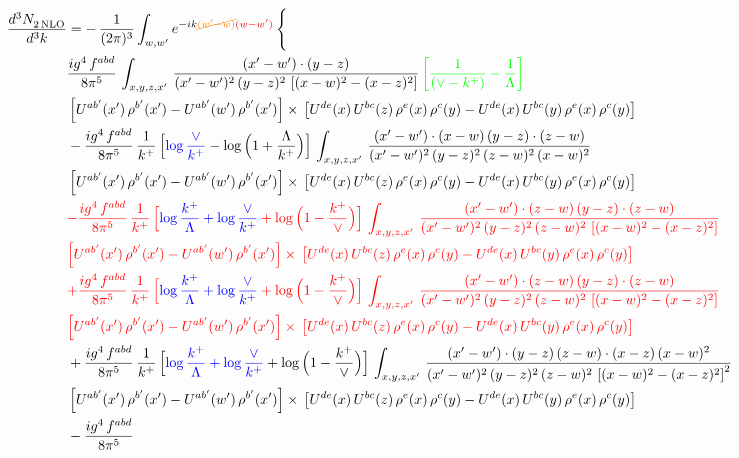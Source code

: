 \documentclass[9pt]{article}
\numberwithin{equation}{section}
\begin{document}
\begin{align}
   \frac{d^{3}N_{2\,\rm NLO}^{\rm}}{d^{3}k}  & = -\,\frac{1}{(2\pi)^{3}}  \int_{w, w^\prime} e^{-ik{\color{orange}\cancel{(w^\prime-w)}}{\color{red}(w-w^\prime)}}\, \Bigg\{\notag \\ & \frac{ig^{4}\, f^{abd}}{8\pi^{5}}\, \int_{x,y,z,x'}\,\frac{(x'-w')\cdot (y-z)}{(x'-w')^{2}\, (y-z)^{2}\,\left[(x-w)^{2}-(x-z)^{2}\right]}\,{\color{green}\left[\frac{1}{(\vee-k^{+})}-\frac{1}{\Lambda}\right]} \notag \\ & \left[U^{ab'}(x')\,\rho^{b'}(x')-U^{ab'}(w')\, \rho^{b'}(x')\right]\times\,\left[U^{de}(x)\,U^{bc}(z)\, \rho^{e}(x)\,\rho^{c}(y)-U^{de}(x)\,U^{bc}(y)\,\rho^{e}(x)\,\rho^{c}(y)\right]\notag \\ & -\frac{ig^{4}\, f^{abd}}{8\pi^{5}}\, \frac{1}{k^{+}}\, \Big[{\color{blue}\log\frac{\vee}{k^{+}}}-\log\Big(1+\frac{\Lambda}{k^{+}}\Big)\Big]\,\int_{x,y,z,x'}\,\frac{(x'-w')\cdot (x-w)\, (y-z)\cdot (z-w)}{(x'-w')^{2}\, (y-z)^{2}\, (z-w)^{2}\,(x-w)^{2}}\, \notag \\ & \left[U^{ab'}(x')\,\rho^{b'}(x')-U^{ab'}(w')\, \rho^{b'}(x')\right]\times\,\left[U^{de}(x)\,U^{bc}(z)\, \rho^{e}(x)\,\rho^{c}(y)-U^{de}(x)\,U^{bc}(y)\,\rho^{e}(x)\,\rho^{c}(y)\right]\notag \\ & {\color{red}-\frac{ig^{4}\, f^{abd}}{8\pi^{5}}\, \frac{1}{k^{+}}\, \Big[{\color{blue}\log\frac{k^{+}}{\Lambda}+\log\frac{\vee}{k^{+}}}+\log\Big(1-\frac{k^{+}}{\vee}\Big)\Big]\,\int_{x,y,z,x'}\,\frac{(x'-w')\cdot (z-w)\, (y-z)\cdot (z-w)}{(x'-w')^{2}\, (y-z)^{2}\, (z-w)^{2}\,\left[(x-w)^{2}-(x-z)^{2}\right]}\,} \notag \\ & {\color{red}\left[U^{ab'}(x')\,\rho^{b'}(x')-U^{ab'}(w')\, \rho^{b'}(x')\right]\times\,\left[U^{de}(x)\,U^{bc}(z)\, \rho^{e}(x)\,\rho^{c}(y)-U^{de}(x)\,U^{bc}(y)\,\rho^{e}(x)\,\rho^{c}(y)\right]}\notag \\ & {\color{red}+ \frac{ig^{4}\, f^{abd}}{8\pi^{5}}\, \frac{1}{k^{+}}\,\Big[{\color{blue}\log\frac{k^{+}}{\Lambda}+\log\frac{\vee}{k^{+}}}+\log\Big(1-\frac{k^{+}}{\vee}\Big)\Big]\,\int_{x,y,z,x'}\,\frac{(x'-w')\cdot (z-w)\, (y-z)\cdot (z-w)}{(x'-w')^{2}\, (y-z)^{2}\, (z-w)^{2}\,\left[(x-w)^{2}-(x-z)^{2}\right]}} \notag \\ & {\color{red}\left[U^{ab'}(x')\,\rho^{b'}(x')-U^{ab'}(w')\, \rho^{b'}(x')\right]\times\,\left[U^{de}(x)\,U^{bc}(z)\, \rho^{e}(x)\,\rho^{c}(y)-U^{de}(x)\,U^{bc}(y)\,\rho^{e}(x)\,\rho^{c}(y)\right]}\notag \\ &  + \frac{ig^{4}\, f^{abd}}{8\pi^{5}}\, \frac{1}{k^{+}}\,\Big[{\color{blue}\log\frac{k^{+}}{\Lambda}+\log\frac{\vee}{k^{+}}}+\log\Big(1-\frac{k^{+}}{\vee}\Big)\Big]\, \int_{x,y,z,x'}\,\frac{(x'-w')\cdot  (y-z)\, (z-w)\cdot (x-z)\, (x-w)^{2}}{(x'-w')^{2}\, (y-z)^{2}\, (z-w)^{2}\,\left[(x-w)^{2}-(x-z)^{2}\right]^{2}}\, \notag \\ & \left[U^{ab'}(x')\,\rho^{b'}(x')-U^{ab'}(w')\, \rho^{b'}(x')\right]\times\,\left[U^{de}(x)\,U^{bc}(z)\, \rho^{e}(x)\,\rho^{c}(y)-U^{de}(x)\,U^{bc}(y)\,\rho^{e}(x)\,\rho^{c}(y)\right]\notag \\ &   - \frac{ig^{4}\, f^{abd}}{8\pi^{5}}\, 
\end{align}
\end{document}
